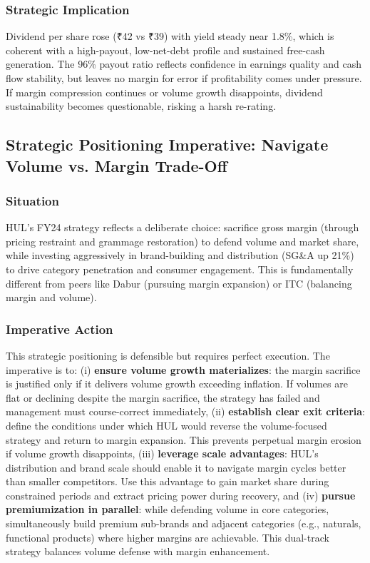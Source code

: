 \documentclass[12pt, a4paper]{report}
\begin{document}
\subsubsection{Strategic Implication}
Dividend per share rose (₹42 vs ₹39) with yield steady near 1.8\%, which is coherent with a high-payout, low-net-debt profile and sustained free-cash generation. The 96\% payout ratio reflects confidence in earnings quality and cash flow stability, but leaves no margin for error if profitability comes under pressure. If margin compression continues or volume growth disappoints, dividend sustainability becomes questionable, risking a harsh re-rating.

\subsection{Strategic Positioning Imperative: Navigate Volume vs. Margin Trade-Off}

\subsubsection{Situation}
HUL's FY24 strategy reflects a deliberate choice: sacrifice gross margin (through pricing restraint and grammage restoration) to defend volume and market share, while investing aggressively in brand-building and distribution (SG\&A up 21\%) to drive category penetration and consumer engagement. This is fundamentally different from peers like Dabur (pursuing margin expansion) or ITC (balancing margin and volume).

\subsubsection{Imperative Action}
This strategic positioning is defensible but requires perfect execution. The imperative is to: (i) \textbf{ensure volume growth materializes}: the margin sacrifice is justified only if it delivers volume growth exceeding inflation. If volumes are flat or declining despite the margin sacrifice, the strategy has failed and management must course-correct immediately, (ii) \textbf{establish clear exit criteria}: define the conditions under which HUL would reverse the volume-focused strategy and return to margin expansion. This prevents perpetual margin erosion if volume growth disappoints, (iii) \textbf{leverage scale advantages}: HUL's distribution and brand scale should enable it to navigate margin cycles better than smaller competitors. Use this advantage to gain market share during constrained periods and extract pricing power during recovery, and (iv) \textbf{pursue premiumization in parallel}: while defending volume in core categories, simultaneously build premium sub-brands and adjacent categories (e.g., naturals, functional products) where higher margins are achievable. This dual-track strategy balances volume defense with margin enhancement.
\end{document}
